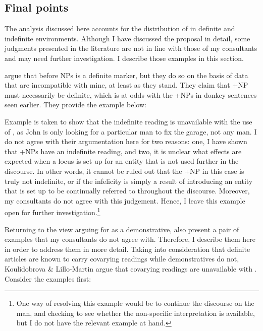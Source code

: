\documentclass[output=paper,
modfonts
]{langscibook}
\begin{document}
\subsection{Final points}

The analysis discussed here accounts for the distribution of  in definite and indefinite environments. Although I have discussed the proposal in detail, some judgments presented in the literature are not in line with those of my consultants and may need further investigation. I describe those examples in this section.

\citet{Bahanetal1995} argue that  before NPs is a definite marker, but they do so on the basis of data that are incompatible with mine, at least as they stand. They claim that +NP must necessarily be definite, which is at odds with the +NPs in donkey sentences seen earlier. They provide the example below: 

\begin{exe}
\end{exe}

Example  is taken to show that the indefinite reading is unavailable with the use of , as John is only looking for a particular man to fix the garage, not any man. I do not agree with their argumentation here for two reasons: one, I have shown that +NPs have an indefinite reading, and two, it is unclear what effects are expected when a locus is set up for an entity that is not used further in the discourse. In other words, it cannot be ruled out that the +NP  in this case is truly not indefinite, or if the infelicity is simply a result of introducing an entity that is set up to be continually referred to throughout the discourse. Moreover, my consultants do not agree with this judgement. Hence, I leave this example open for further investigation.\footnote{One way of resolving this example would be to continue the discourse on the man, and checking to see whether the non-specific interpretation is available, but I do not have the relevant example at hand.} 


Returning to the view arguing for  as a demonstrative, \citet{KoulidobrovaLilloMartin2016} also present a pair of examples that my consultants do not agree with. Therefore, I describe them here in order to address them in more detail. Taking into consideration that definite articles are known to carry covarying readings while demonstratives do not, Koulidobrova \& Lillo-Martin argue that covarying readings are unavailable with . Consider the  examples first:
\end{document}
